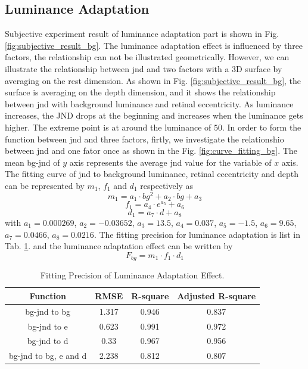 \documentclass[journal]{IEEEtran}
\begin{document}
\subsection{Luminance Adaptation}
Subjective experiment result of luminance adaptation part is shown in Fig. \ref{fig:subjective_result_bg}. The luminance adaptation effect is influenced by three factors, the relationship can not be illustrated geometrically. However, we can illustrate the relationship between jnd and two factors with a 3D surface by averaging on the rest dimension. As shown in Fig. \ref{fig:subjective_result_bg}, the surface is averaging on the depth dimension, and it shows the relationship between jnd with background luminance and retinal eccentricity. As luminance increases, the JND drops at the beginning and increases when the luminance gets higher. The extreme point is at around the luminance of $50$. In order to form the function between jnd and three factors, firtly, we investigate the relationshio between jnd and one fator once as shown in the Fig. \ref{fig:curve_fitting_bg}. The mean bg-jnd of $y$ axis represents the average jnd value for the variable of $x$ axis. The fitting curve of jnd to background luminance, retinal eccentricity and depth can be represented by $m_1$, $f_1$ and $d_1$ respectively as
\begin{equation}
m_1=a_1\cdot bg^2+a_2\cdot bg+a_3
\end{equation}
\begin{equation}
f_1=a_4\cdot e^{a_5}+a_6
\end{equation}
\begin{equation}
d_1=a_7\cdot d+a_8
\end{equation}
with $a_1=0.000269$, $a_2=-0.03652$, $a_3=13.5$, $a_4=0.037$, $a_5=-1.5$, $a_6=9.65$, $a_7=0.0466$, $a_8=0.0216$. The fitting precision for luminance adaptation is list in Tab. \ref{tab:fit_precition_bg}.
and the luminance adaptation effect can be written by
\begin{equation}
F_{bg}=m_1\cdot f_1 \cdot d_1
\end{equation}
\begin{table}[htbp]
	\centering
	\caption{Fitting Precision of Luminance Adaptation Effect.}
	\begin{tabular}{|c|c|c|c|}
				\hline
		Function & RMSE & R-square & Adjusted R-square \\
				\hline
		bg-jnd to bg & 1.317 & 0.946 & 0.837 \\
				\hline
		bg-jnd to e & 0.623 & 0.991 & 0.972 \\
				\hline
		bg-jnd to d & 0.33 & 0.967 & 0.956 \\
				\hline
		bg-jnd to bg, e and d & 2.238 & 0.812 & 0.807 \\
				\hline
	\end{tabular}%
	\label{tab:fit_precition_bg}%
\end{table}%
\end{document}
